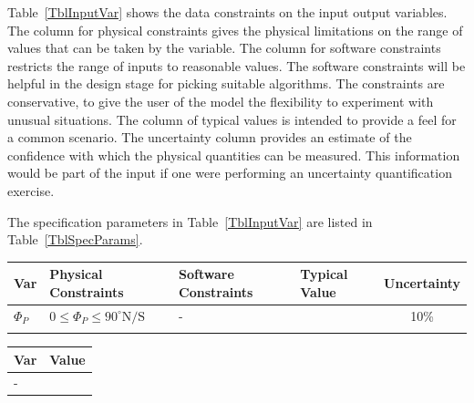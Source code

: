 \documentclass[12pt]{article}
\begin{document}
Table~\ref{TblInputVar} shows the data constraints on the input output
variables.  The column for physical constraints gives the physical limitations
on the range of values that can be taken by the variable.  The column for
software constraints restricts the range of inputs to reasonable values.  The
software constraints will be helpful in the design stage for picking suitable
algorithms.  The constraints are conservative, to give the user of the model the
flexibility to experiment with unusual situations.  The column of typical values
is intended to provide a feel for a common scenario.  The uncertainty column
provides an estimate of the confidence with which the physical quantities can be
measured.  This information would be part of the input if one were performing an
uncertainty quantification exercise.

The specification parameters in Table~\ref{TblInputVar} are listed in
Table~\ref{TblSpecParams}.

\begin{table}[!h]
  \caption{Input Variables} \label{TblInputVar}
  \renewcommand{\arraystretch}{1.2}
\noindent \begin{longtable*}{l l l l c} 
  \toprule
  \textbf{Var} & \textbf{Physical Constraints} & \textbf{Software Constraints} &
                             \textbf{Typical Value} & \textbf{Uncertainty}\\
  \midrule 
  $\Phi_P$ & $0 \leq \Phi_P \leq 90^\circ \text{N/S}$ & $\text{-}$ & {} & 10\%\\

  \\
  \bottomrule
\end{longtable*}
\end{table}

\noindent 

\begin{table}[!h]
\caption{Specification Parameter Values} \label{TblSpecParams}
\renewcommand{\arraystretch}{1.2}
\noindent \begin{longtable*}{l l} 
  \toprule
  \textbf{Var} & \textbf{Value} \\
  \midrule 
  $\text{-}$ & \text{-}\\
  \bottomrule
\end{longtable*}
\end{table}
\end{document}
